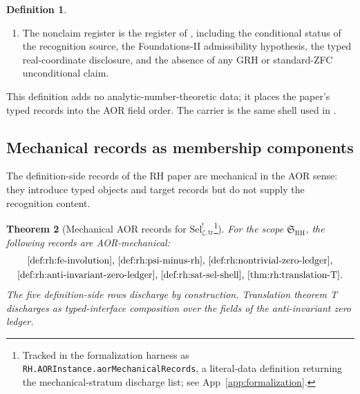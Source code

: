 \documentclass[11pt]{article}
\newcommand{\Sel}{\mathrm{Sel}^{!}_{\zeta,\mathrm{tr}}}
\newtheorem{theorem}{Theorem}[section]
\theoremstyle{definition}
\newtheorem{definition}[theorem]{Definition}
\begin{document}
\begin{definition}
\begin{enumerate}[label=\textup{(\arabic*)}]
        .
  \item The nonclaim register is the register of
        , including the conditional
        status of the recognition source, the Foundations-II
        admissibility hypothesis, the typed real-coordinate
        disclosure, and the absence of any GRH or standard-ZFC
        unconditional claim.
\end{enumerate}
\end{definition}

This definition adds no analytic-number-theoretic data; it places the
paper's typed records into the AOR field order.  The carrier is the
same shell used in .

\subsection{Mechanical records as membership components}

The definition-side records of the RH paper are mechanical in the
AOR sense: they introduce typed objects and target records but do
not supply the recognition content.

\begin{theorem}[Mechanical AOR records for \(\Sel\)\footnote{Tracked in the formalization harness as \nolinkurl{RH.AORInstance.aorMechanicalRecords}, a literal-data definition returning the mechanical-stratum discharge list; see App~\ref{app:formalization}.}]
\label{thm:rh:aor-mechanical-records}
For the scope \(\mathfrak S_{\mathrm{RH}}\), the following records are
AOR-mechanical:
\[
\begin{gathered}
  \text{\Cref{def:rh:fe-involution}, }
  \text{\Cref{def:rh:psi-minus-rh}, }
  \text{\Cref{def:rh:nontrivial-zero-ledger},} \\
  \text{\Cref{def:rh:anti-invariant-zero-ledger}, }
  \text{\Cref{def:rh:sat-sel-shell}, }
  \text{\Cref{thm:rh:translation-T}.}
\end{gathered}
\]
The five definition-side rows discharge by construction.  Translation
theorem T discharges as typed-interface composition over the fields of
the anti-invariant zero ledger.
\end{theorem}
\end{document}
